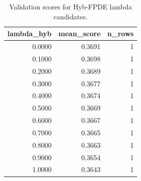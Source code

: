 \begin{table}[t]
\caption{Validation scores for Hyb-FPDE lambda candidates.}
\label{tab:lambda_distribution_computed}
\centering
\begin{tabular}{rrr}
\toprule
lambda\_hyb & mean\_score & n\_rows \\
\midrule
0.0000 & 0.3691 & 1 \\
0.1000 & 0.3698 & 1 \\
0.2000 & 0.3689 & 1 \\
0.3000 & 0.3677 & 1 \\
0.4000 & 0.3674 & 1 \\
0.5000 & 0.3669 & 1 \\
0.6000 & 0.3667 & 1 \\
0.7000 & 0.3665 & 1 \\
0.8000 & 0.3663 & 1 \\
0.9000 & 0.3654 & 1 \\
1.0000 & 0.3643 & 1 \\
\bottomrule
\end{tabular}

\end{table}

